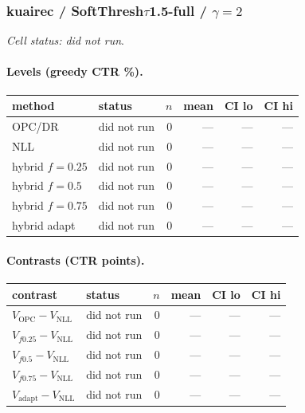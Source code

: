 \documentclass[10pt,a4paper]{article}
\begin{document}
\subsubsection{kuairec / SoftThresh$\tau$1.5-full / $\gamma=2$}
\emph{Cell status: did not run}.
\paragraph{Levels (greedy CTR \%).}
{\centering\small\begin{tabular}{llrrrr}
\toprule method & status & $n$ & mean & CI lo & CI hi \\
\midrule
OPC/DR & did not run & 0 & --- & --- & --- \\
NLL & did not run & 0 & --- & --- & --- \\
hybrid $f{=}0.25$ & did not run & 0 & --- & --- & --- \\
hybrid $f{=}0.5$ & did not run & 0 & --- & --- & --- \\
hybrid $f{=}0.75$ & did not run & 0 & --- & --- & --- \\
hybrid adapt & did not run & 0 & --- & --- & --- \\
\bottomrule\end{tabular}\par}
\paragraph{Contrasts (CTR points).}
{\centering\small\begin{tabular}{llrrrr}
\toprule contrast & status & $n$ & mean & CI lo & CI hi \\
\midrule
$V_{\mathrm{OPC}}-V_{\mathrm{NLL}}$ & did not run & 0 & --- & --- & --- \\
$V_{f0.25}-V_{\mathrm{NLL}}$ & did not run & 0 & --- & --- & --- \\
$V_{f0.5}-V_{\mathrm{NLL}}$ & did not run & 0 & --- & --- & --- \\
$V_{f0.75}-V_{\mathrm{NLL}}$ & did not run & 0 & --- & --- & --- \\
$V_{\mathrm{adapt}}-V_{\mathrm{NLL}}$ & did not run & 0 & --- & --- & --- \\
\bottomrule\end{tabular}\par}
\end{document}
